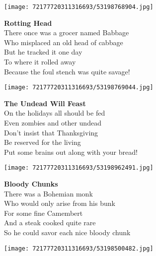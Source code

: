 \documentclass[10pt,letterpaper]{article}
\begin{document}
\begin{center}
\texttt{[image: 72177720311316693/53198768904.jpg]}
\end{center}

\begin{center}
\textbf{Rotting Head}\\
\vskip 0.2in
There once was a grocer named Babbage\\
Who misplaced an old head of cabbage\\
But he tracked it one day\\
To where it rolled away\\
Because the foul stench was quite savage!\\
\end{center}
\pagebreak

\begin{center}\texttt{[image: 72177720311316693/53198769044.jpg]}
\end{center}
\begin{center}
\textbf{The Undead Will Feast}\\
\vskip 0.2in
On the holidays all should be fed\\
Even zombies and other undead\\
Don't insist that Thanksgiving\\
Be reserved for the living\\
Put some brains out along with your bread!\\
\end{center}
\pagebreak

\begin{center}\texttt{[image: 72177720311316693/53198962491.jpg]}
\end{center}
\begin{center}
\textbf{Bloody Chunks}\\
\vskip 0.2in
There was a Bohemian monk\\
Who would only arise from his bunk\\
For some fine Camembert\\
And a steak cooked quite rare\\
So he could savor each nice bloody chunk\\
\end{center}
\pagebreak

\begin{center}
\texttt{[image: 72177720311316693/53198500482.jpg]}
\end{center}
\end{document}
